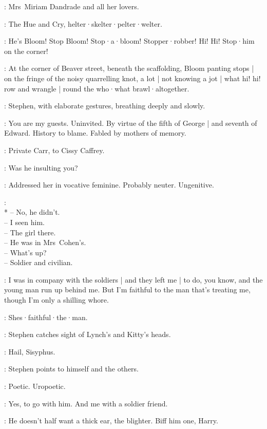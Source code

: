:
Mrs~Miriam Dandrade and all her lovers.

:
The Hue and Cry,
helter·skelter·pelter·welter.

\HueCry:
He's Bloom!
Stop Bloom!
Stop·a·bloom!
Stopper·robber!
Hi!
Hi!
Stop·him on the corner!


:
At the corner of Beaver street,
beneath the scaffolding,
Bloom panting stops |
on the fringe of the noisy quarrelling knot,
a lot |
not knowing a jot |
what hi!
hi!
row and wrangle |
round the who·what brawl·altogether.

:
Stephen,
with elaborate gestures,
breathing deeply and slowly.

\Stephen:
You are my guests.
Uninvited.
By virtue of the fifth of George |
and seventh of Edward.
History to blame.
Fabled by mothers of memory.

:
Private Carr,
to Cissy Caffrey.

\Carr:
Was he insulting you?

\Stephen:
Addressed her in vocative feminine.
Probably neuter.
Ungenitive.

\Voices:\\*
-- No, he didn't.\\
-- I seen him.\\
-- The girl there.\\
-- He was in Mrs~Cohen's.\\
-- What's up?\\
-- Soldier and civilian.

\Cissy[2]:
%
I was in company with the soldiers |
and they left me |
to do,
you know,
and the young man run up behind me.
But I'm faithful to the man that's treating me,
though I'm only a shilling whore.

\Voices:
Shes·faithful·the·man.

:
Stephen catches sight of Lynch's and Kitty's heads.

\Stephen:
Hail,
Sisyphus.

:
Stephen points to himself and the others.

\Stephen:
Poetic.
Uropoetic.

\Cissy:
Yes,
to go with him.
%
And me with a soldier friend.

\Compton[2]:
He doesn't half want a thick ear,
the blighter.
Biff him one,
Harry.

